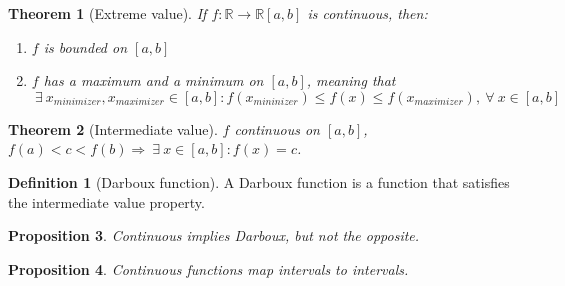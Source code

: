 \documentclass{article}
\newcommand{\Ar}{\Rightarrow}
\newenvironment{enumrom}{\begin{enumerate}[label=(\roman*)]}{\end{enumerate}}
\newcommand{\fOnR}[1]{#1 : \mathbb{R} \rightarrow \mathbb{R}}
\newcommand{\intcc}[1]{\left[#1\right]}
\theoremstyle{definition}
\newtheorem{definition}{Definition}[section]
\theoremstyle{definition}
\theoremstyle{plain}
\newtheorem{theorem}{Theorem}[section]
\theoremstyle{plain}
\theoremstyle{plain}
\theoremstyle{plain}
\newtheorem{proposition}[theorem]{Proposition}
\theoremstyle{definition}
\theoremstyle{remark}
\theoremstyle{remark}
\theoremstyle{remark}
\theoremstyle{remark}
\newcommand{\ForAll}{\ \forall \ }
\newcommand{\Exists}{\ \exists \ }
\begin{document}
\begin{theorem}[Extreme value]
  If $\fOnR{f}{\intcc{a,b}}$ is continuous, then:
  \begin{enumrom}
    \item $f$ is bounded on $\intcc{a,b}$
    \item $f$ has a maximum and a minimum on $\intcc{a,b}$, meaning that
      \[
      \Exists x_{minimizer}, x_{maximizer} \in \intcc{a,b} :
      f(x_{mininizer}) \leq f(x) \leq f(x_{maximizer}), \ForAll x \in \intcc{a,b}
      \]
  \end{enumrom}
\end{theorem}



\begin{theorem}[Intermediate value]
  $f$ continuous on $\intcc{a,b}$, $f(a) < c < f(b) \Ar \Exists x \in \intcc{a,b} : f(x) = c$.
\end{theorem}



\begin{definition}[Darboux function]
  A Darboux function is a function that satisfies the intermediate value property.
\end{definition}


\begin{proposition}
  Continuous implies Darboux, but not the opposite.
\end{proposition}



\begin{proposition}
  Continuous functions map intervals to intervals.
\end{proposition}
\end{document}
